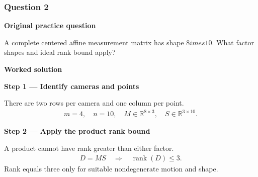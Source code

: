 \documentclass[letterpaper,11pt,english,openany,oneside]{jupyterBook}
\begin{document}
\par

\par\medskip


\subsubsection{Question 2}
\label{\detokenize{lectures/lecture06/tldr:question-2}}
\par\medskip\textbf{Original practice question}\par\smallskip

\sphinxAtStartPar
A complete centered affine measurement matrix has shape \(8	imes10\). What factor shapes and ideal rank bound apply?

\par\medskip

\par\medskip
\textbf{Worked solution}\par\smallskip

\par\medskip{}
{\color{QuizStepRed}\bfseries Step 1 — Identify cameras and points}\par\smallskip

\sphinxAtStartPar
{} There are two rows per camera and one column per point.
{\color{QuizMathBlue} \begin{equation*}
\begin{split}m=4,\quad n=10,\quad M\in\mathbb R^{8\times3},\quad S\in\mathbb R^{3\times10}.\end{split}
\end{equation*}}
\par

\par\medskip{}
{\color{QuizStepRed}\bfseries Step 2 — Apply the product rank bound}\par\smallskip

\sphinxAtStartPar
{} A product cannot have rank greater than either factor.
{\color{QuizMathBlue} \begin{equation*}
\begin{split}D=MS\quad\Longrightarrow\quad\operatorname{rank}(D)\le3.\end{split}
\end{equation*}}
\sphinxAtStartPar
Rank equals three only for suitable nondegenerate motion and shape.

\par
\end{document}

